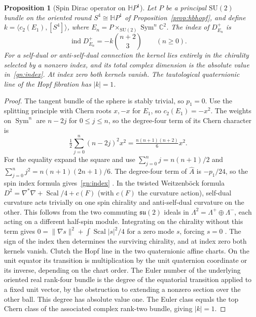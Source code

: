 \documentclass[aps,pra,onecolumn,superscriptaddress,nofootinbib,10pt]{revtex4-2}
\newtheorem{proposition}[theorem]{Proposition}
\theoremstyle{definition}
\theoremstyle{remark}
\newcommand{\SU}{\mathrm{SU}}
\begin{document}
\begin{proposition}[Spin Dirac operator on $\mathbb H P^1$]\label{gn:s4}
Let $P$ be a principal $\SU(2)$ bundle on the oriented round
$S^4\cong\mathbb H P^1$ of Proposition~\ref{prop:hbhopf}, and define
$k=\langle c_2(E_1),[S^4]\rangle$, where $E_n=P\times_{\SU(2)}
\operatorname{Sym}^n\mathbb C^2$. The index of $D^+_{E_n}$ is
\begin{equation}\label{gn:index}
 \operatorname{ind}D^+_{E_n}
  =-k\binom{n+2}{3}\qquad(n\geq0).
\end{equation}
For a self-dual or anti-self-dual connection the kernel lies entirely
in the chirality selected by a nonzero index, and its total complex
dimension is the absolute value in~\eqref{gn:index}. At index zero
both kernels vanish. The tautological quaternionic line
of the Hopf fibration has $|k|=1$.
\end{proposition}
\begin{proof}
The tangent bundle of the sphere is stably trivial, so $p_1=0$.
Use the splitting principle with Chern roots $x,-x$ for $E_1$,
so $c_2(E_1)=-x^2$. The weights on $\operatorname{Sym}^n$ are $n-2j$
for $0\le j\le n$, so the degree-four term of its Chern character is
\[
 \tfrac12\sum_{j=0}^n(n-2j)^2x^2
 =\tfrac{n(n+1)(n+2)}6x^2 .
\]
For the equality expand the square and use
$\sum_{j=0}^n j=n(n+1)/2$ and $\sum_{j=0}^n j^2=n(n+1)(2n+1)/6$.
The degree-four term of $\widehat A$ is $-p_1/24$, so the spin index
formula gives~\eqref{gn:index} \cite[Theorem~1.1]{gn:AS}.
In the twisted Weitzenb\"ock formula
$D^2=\nabla^*\nabla+\operatorname{Scal}/4+c(F)$
(with $c(F)$ the curvature action), self-dual curvature acts trivially
on one spin chirality and anti-self-dual curvature on the other.
This follows from the two commuting $\mathfrak{su}(2)$ ideals in
$\Lambda^2=\Lambda^+\oplus\Lambda^-$, each acting on a different
half-spin module. Integrating on the chirality without this term gives
$0=\|\nabla s\|^2+\int\operatorname{Scal}|s|^2/4$ for a zero mode $s$,
forcing $s=0$ \cite[Ch.~II, \S8]{cr:lawson}. The sign of the index
then determines the surviving chirality, and at index zero both kernels
vanish. Clutch the Hopf line in the two quaternionic affine charts.
On the unit equator its transition is multiplication by the unit
quaternion coordinate or its inverse, depending on the chart order.
The Euler number of the underlying oriented real rank-four bundle is
the degree of the equatorial transition applied to a fixed unit vector,
by the obstruction to extending a nonzero section over the other
ball. This degree has absolute value one. The Euler class equals the
top Chern class of the associated complex rank-two bundle, giving
$|k|=1$.
\end{proof}
\end{document}
